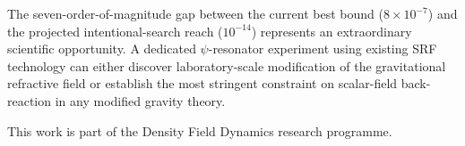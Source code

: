 \documentclass[12pt,aps,prd,twocolumn,superscriptaddress,nofootinbib]{revtex4-2}
\begin{document}
The seven-order-of-magnitude gap between the current best bound
($8\times10^{-7}$) and the projected intentional-search reach
($10^{-14}$) represents an extraordinary scientific opportunity.
A dedicated $\psi$-resonator experiment using existing SRF
technology can either discover laboratory-scale modification of
the gravitational refractive field or establish the most stringent
constraint on scalar-field back-reaction in any modified gravity
theory.

\begin{acknowledgments}
This work is part of the Density Field Dynamics research programme.
\end{acknowledgments}

\end{document}
